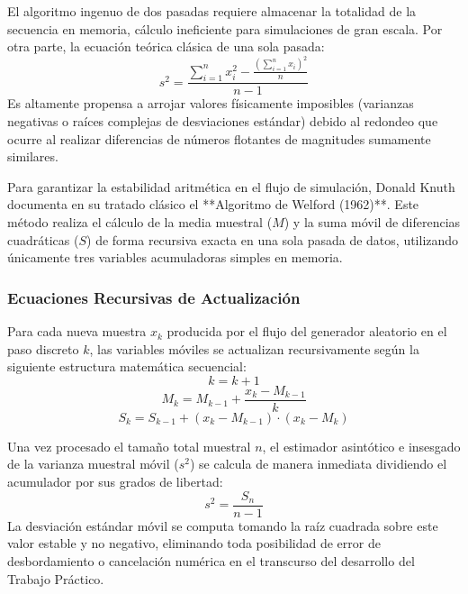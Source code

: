 \documentclass{article}
\begin{document}
El algoritmo ingenuo de dos pasadas requiere almacenar la totalidad de la secuencia en memoria, cálculo ineficiente para simulaciones de gran escala. Por otra parte, la ecuación teórica clásica de una sola pasada:
\begin{equation}
    s^2 = \frac{\sum_{i=1}^n x_i^2 - \frac{\left(\sum_{i=1}^n x_i\right)^2}{n}}{n - 1}
\end{equation}
Es altamente propensa a arrojar valores físicamente imposibles (varianzas negativas o raíces complejas de desviaciones estándar) debido al redondeo que ocurre al realizar diferencias de números flotantes de magnitudes sumamente similares.

Para garantizar la estabilidad aritmética en el flujo de simulación, Donald Knuth documenta en su tratado clásico el **Algoritmo de Welford (1962)**. Este método realiza el cálculo de la media muestral ($M$) y la suma móvil de diferencias cuadráticas ($S$) de forma recursiva exacta en una sola pasada de datos, utilizando únicamente tres variables acumuladoras simples en memoria.

\subsubsection{Ecuaciones Recursivas de Actualización}
Para cada nueva muestra $x_k$ producida por el flujo del generador aleatorio en el paso discreto $k$, las variables móviles se actualizan recursivamente según la siguiente estructura matemática secuencial:
\begin{equation}
    k = k + 1
\end{equation}
\begin{equation}
    M_k = M_{k-1} + \frac{x_k - M_{k-1}}{k}
\end{equation}
\begin{equation}
    S_k = S_{k-1} + (x_k - M_{k-1}) \cdot (x_k - M_k)
\end{equation}

Una vez procesado el tamaño total muestral $n$, el estimador asintótico e insesgado de la varianza muestral móvil ($s^2$) se calcula de manera inmediata dividiendo el acumulador por sus grados de libertad:
\begin{equation}
    s^2 = \frac{S_n}{n - 1}
\end{equation}
La desviación estándar móvil se computa tomando la raíz cuadrada sobre este valor estable y no negativo, eliminando toda posibilidad de error de desbordamiento o cancelación numérica en el transcurso del desarrollo del Trabajo Práctico.
\end{document}
